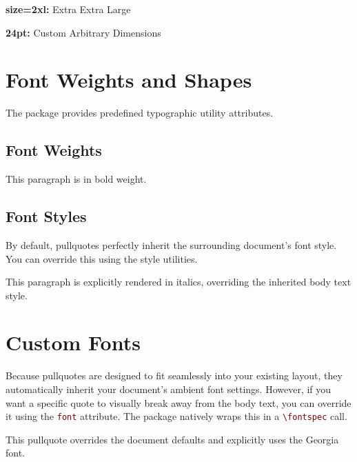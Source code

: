 \documentclass[12pt, a4paper]{article}
\let\oldtexttt\texttt
\renewcommand{\texttt}[1]{\textcolor{Maroon}{\oldtexttt{#1}}}
\begin{document}
\begin{pullquote}[size=2xl]
\textbf{size=2xl:} Extra Extra Large
\end{pullquote}

\begin{pullquote}[size=\fontsize{24pt}{28.8pt}\selectfont]
\textbf{24pt:} Custom Arbitrary Dimensions
\end{pullquote}

\section*{Font Weights and Shapes}

The package provides predefined typographic utility attributes.

\subsection*{Font Weights}

\begin{pullquote}[weight=bold]
This paragraph is in bold weight.
\end{pullquote}

\subsection*{Font Styles}

By default, pullquotes perfectly inherit the surrounding document's font style. You can override this using the style utilities.

\begin{pullquote}[style=italic]
This paragraph is explicitly rendered in italics, overriding the inherited body text style.
\end{pullquote}

\section*{Custom Fonts}

Because pullquotes are designed to fit seamlessly into your existing layout, they automatically inherit your document's ambient font settings. However, if you want a specific quote to visually break away from the body text, you can override it using the \texttt{font} attribute. The package natively wraps this in a \texttt{\textbackslash fontspec} call.

\begin{pullquote}[font={Georgia}]
This pullquote overrides the document defaults and explicitly uses the Georgia font.
\end{pullquote}
\end{document}
